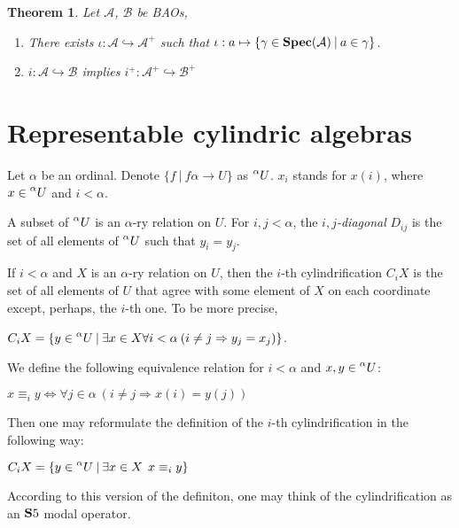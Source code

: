 \documentclass[a4paper]{article}
\theoremstyle{defin}
\theoremstyle{theorem}
\newtheorem{theorem}{Theorem}
\theoremstyle{claim}
\theoremstyle{prop}
\theoremstyle{lemma}
\theoremstyle{fact}
\theoremstyle{ex}
\theoremstyle{col}
\begin{document}
\begin{theorem} Let $\mathcal{A}$, $\mathcal{B}$ be BAOs,

\begin{enumerate}
  \item There exists $\iota : \mathcal{A} \hookrightarrow \mathcal{A}^{+}$ such that
  $\iota : a \mapsto \{ \gamma \in {\bf Spec}(\mathcal{A}) \: | \: a \in \gamma \}$.
  \item $i : \mathcal{A} \hookrightarrow \mathcal{B}$ implies
  $i^{+} : \mathcal{A}^{+} \hookrightarrow \mathcal{B}^{+}$
\end{enumerate}
\end{theorem}

\section{Representable cylindric algebras}

Let $\alpha$ be an ordinal. Denote $\{ f \: | \: f \alpha \to U\}$ as $\prescript{\alpha}{}U$. $x_i$ stands for $x(i)$, where
$x \in \prescript{\alpha}{}U$ and $i < \alpha$.

A subset of $\prescript{\alpha}{}U$ is an $\alpha$-ry relation on $U$. For $i, j < \alpha$, the \emph{$i,j$-diagonal} $D_{ij}$ is the set of all elements of $\prescript{\alpha}{}U$ such that $y_i = y_j$.

If $i < \alpha$ and $X$ is an $\alpha$-ry relation on $U$, then
the $i$-th cylindrification $C_i X$ is the set of all elements of $U$ that agree with some element of $X$ on each coordinate except, perhaps, the $i$-th one. To be more precise,
\begin{center}
$C_i X = \{ y \in \prescript{\alpha}{}U \: |
\: \exists x \in X \forall i < \alpha \: (i \neq j \Rightarrow y_j = x_j)\}$.
\end{center}
We define the following equivalence relation for $i < \alpha$ and $x, y \in \prescript{\alpha}{}U$:
\begin{center}
 $x \equiv_i y \Leftrightarrow \forall j \in \alpha \: (i \neq j \Rightarrow x(i) = y(j))$
\end{center}
Then one may reformulate the definition of the $i$-th cylindrification in the following way:

\begin{center}
 $C_i X = \{ y \in \prescript{\alpha}{}U \: | \: \exists x \in X \:\: x \equiv_i y \}$
\end{center}

According to this version of the definiton, one may think of the cylindrification as an ${\bf S}5$ modal operator.
\end{document}
